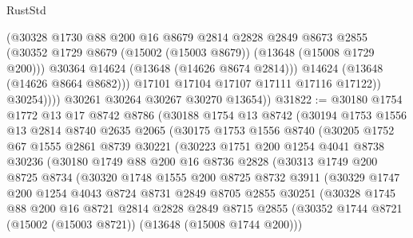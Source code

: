 \begin{lexlean}{RustStd}
\begin{coremodule}
                      (@30328
                        @1730
                        @88
                        @200
                        @16
                        @8679
                        @2814
                        @2828
                        @2849
                        @8673
                        @2855
                        (@30352 @1729 @8679 (@15002 (@15003 @8679)) (@13648 (@15008 @1729 @200)))
                        @30364
                        @14624
                        (@13648 (@14626 @8674 @2814)))
                      @14624
                      (@13648 (@14626 @8664 @8682)))
                    @17101
                    @17104
                    @17107
                    @17111
                    @17116
                    @17122))
                @30254))))
        @30261
        @30264
        @30267
        @30270
        @13654))
@31822 := @30180
    @1754
    @1772
    @13
    @17
    @8742
    @8786
    (@30188
      @1754
      @13
      @8742
      (@30194
        @1753
        @1556
        @13
        @2814
        @8740
        @2635
        @2065
        (@30175
          @1753
          @1556
          @8740
          (@30205
            @1752
            @67
            @1555
            @2861
            @8739
            @30221
            (@30223
              @1751
              @200
              @1254
              @4041
              @8738
              @30236
              (@30180
                @1749
                @88
                @200
                @16
                @8736
                @2828
                (@30313
                  @1749
                  @200
                  @8725
                  @8734
                  (@30320
                    @1748
                    @1555
                    @200
                    @8725
                    @8732
                    @3911
                    (@30329
                      @1747
                      @200
                      @1254
                      @4043
                      @8724
                      @8731
                      @2849
                      @8705
                      @2855
                      @30251
                      (@30328
                        @1745
                        @88
                        @200
                        @16
                        @8721
                        @2814
                        @2828
                        @2849
                        @8715
                        @2855
                        (@30352 @1744 @8721 (@15002 (@15003 @8721)) (@13648 (@15008 @1744 @200)))

\end{coremodule}
\end{lexlean}
